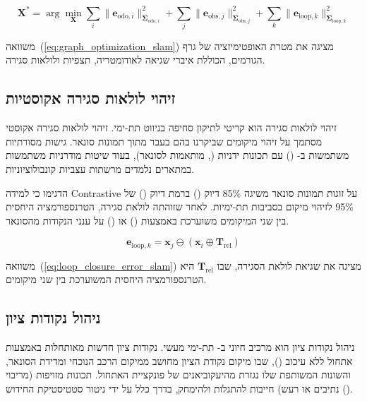 \begin{equation}
\mathbf{X}^* = \arg\min_{\mathbf{X}} \sum_{i} \| \mathbf{e}_{\text{odo}, i} \|_{\boldsymbol{\Sigma}_{\text{odo}, i}}^2 + \sum_{j} \| \mathbf{e}_{\text{obs}, j} \|_{\boldsymbol{\Sigma}_{\text{obs}, j}}^2 + \sum_{k} \| \mathbf{e}_{\text{loop}, k} \|_{\boldsymbol{\Sigma}_{\text{loop}, k}}^2
\label{eq:graph_optimization_slam}
\end{equation}

משוואה~(\ref{eq:graph_optimization_slam}) מציגה את מטרת האופטימיזציה של גרף הגורמים, הכוללת איברי שגיאה לאודומטריה, תצפיות ולולאות סגירה.

\subsection{זיהוי לולאות סגירה אקוסטיות}
\label{sec:acoustic_loop_closure}

זיהוי לולאות סגירה הוא קריטי לתיקון סחיפה בניווט תת-ימי. זיהוי לולאות סגירה אקוסטי מסתמך על זיהוי מיקומים שביקרנו בהם בעבר מתוך תמונות סונאר. גישות מסורתיות משתמשות ב- () עם תכונות ידניות (,  מותאמות לסונאר), בעוד שיטות מודרניות משתמשות במתארים נלמדים מרשתות עצביות קונבולוציוניות.

\citet{Hidalgo2020} הדגימו כי למידה Contrastive על זוגות תמונות סונאר משיגה 85\% דיוק () ברמת דיוק () של 95\% לזיהוי מיקום בסביבות תת-ימיות. לאחר שזוהתה לולאת סגירה, הטרנספורמציה היחסית בין שני המיקומים משוערכת באמצעות  () או  () על ענני הנקודות מהסונאר.

\begin{equation}
\mathbf{e}_{\text{loop}, k} = \mathbf{x}_j \ominus (\mathbf{x}_i \oplus \mathbf{T}_{\text{rel}})
\label{eq:loop_closure_error_slam}
\end{equation}

משוואה~(\ref{eq:loop_closure_error_slam}) מציגה את שגיאת לולאת הסגירה, שבו $\mathbf{T}_{\text{rel}}$ היא הטרנספורמציה היחסית המשוערכת בין שני מיקומים.

\subsection{ניהול נקודות ציון}
\label{sec:landmark_management}

ניהול נקודות ציון הוא מרכיב חיוני ב- תת-ימי מעשי. נקודות ציון חדשות מאותחלות באמצעות אתחול ללא עיכוב (), שבו מיקום נקודת הציון מחושב ממיקום הרכב הנוכחי ומדידת הסונאר, והשונות המשותפת שלו נגזרת מהיעקוביאנים של פונקציית האתחול. תכונות מזויפות (מריבוי נתיבים או רעש) חייבות להתגלות ולהימחק, בדרך כלל על ידי ניטור סטטיסטיקת החידוש ().


